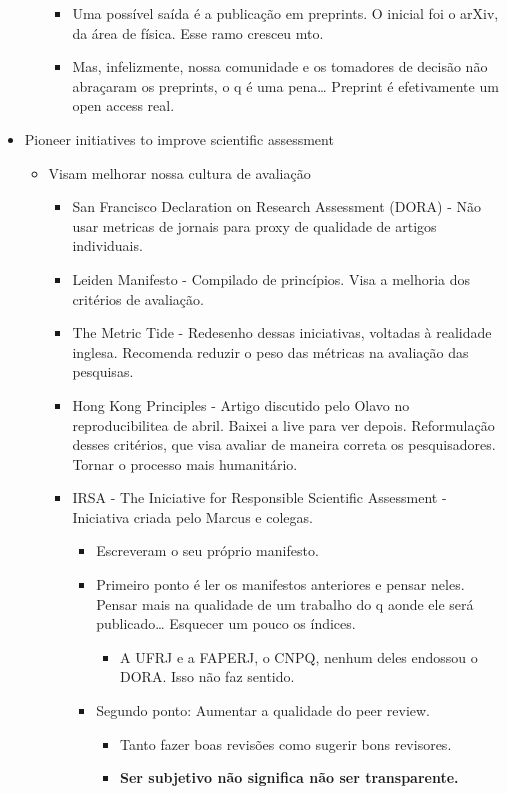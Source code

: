 \documentclass[11pt]{article}
\begin{document}
\begin{itemize}
\begin{itemize}
\begin{itemize}
\item Uma possível saída é a publicação em preprints. O inicial foi o arXiv, da área de física. Esse ramo cresceu mto.
\item Mas, infelizmente, nossa comunidade e os tomadores de decisão não abraçaram os preprints, o q é uma pena\ldots{} Preprint é efetivamente um open access real.
\end{itemize}
\end{itemize}
\item Pioneer initiatives to improve scientific assessment
\begin{itemize}
\item Visam melhorar nossa cultura de avaliação
\begin{itemize}
\item San Francisco Declaration on Research Assessment (DORA) - Não usar metricas de jornais para proxy de qualidade de artigos individuais.
\item Leiden Manifesto - Compilado de princípios. Visa a melhoria dos critérios de avaliação.
\item The Metric Tide - Redesenho dessas iniciativas, voltadas à realidade inglesa. Recomenda reduzir o peso das métricas na avaliação das pesquisas.
\item Hong Kong Principles  \cite{moher2020} - Artigo discutido pelo Olavo no reproducibilitea de abril. Baixei a live para ver depois. Reformulação desses critérios, que visa avaliar de maneira correta os pesquisadores. Tornar o processo mais humanitário.
\item IRSA - The Iniciative for Responsible Scientific Assessment - Iniciativa criada pelo Marcus e colegas.
\begin{itemize}
\item Escreveram o seu próprio manifesto.
\item Primeiro ponto é ler os manifestos anteriores e pensar neles. Pensar mais na qualidade de um trabalho do q aonde ele será publicado\ldots{} Esquecer um pouco os índices.
\begin{itemize}
\item A UFRJ e a FAPERJ, o CNPQ, nenhum deles endossou o DORA. Isso não faz sentido.
\end{itemize}
\item Segundo ponto: Aumentar a qualidade do peer review.
\begin{itemize}
\item Tanto fazer boas revisões como sugerir bons revisores.
\item \textbf{Ser subjetivo não significa não ser transparente.}

\end{itemize}
\end{itemize}
\end{itemize}
\end{itemize}
\end{itemize}
\end{document}
